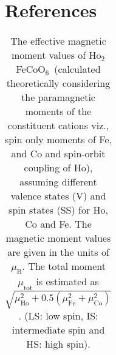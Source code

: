 \documentclass[12pt,twocolumns]{iopart}
\newcommand{\HFCO}{Ho$_2$FeCoO$_6$}
\begin{document}
\section*{References}


\newpage
\begin{center}
	\begin{table}[!b]
		\setlength{\tabcolsep}{10pt}
		\caption{The effective magnetic moment values of \HFCO\ (calculated theoretically considering the paramagnetic moments of the constituent cations viz., spin only moments of Fe, and Co and spin-orbit coupling of Ho), assuming different valence states (V) and  spin states (SS) for Ho, Co and Fe. The magnetic moment values are given in the units of $\mu_\mathrm{B}$. The total moment $\mu_\mathrm{tot}$ is estimated as $\sqrt{\mu^2_\mathrm{Ho} + 0.5 (\mu^2_\mathrm{Fe} + \mu^2_\mathrm{Co})}$.  (LS: low spin, IS: intermediate spin and HS: high spin).  \label{tab:spins}}
		\centering
		\begin{tabular}[h]{cccc}
			

\end{tabular}
\end{table}
\end{center}
\end{document}
